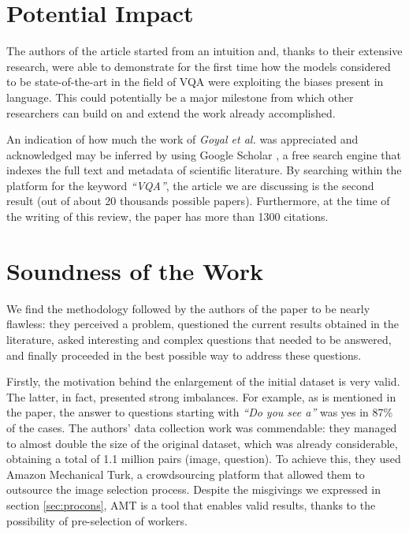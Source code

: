 \documentclass[letterpaper,11pt]{article}
\begin{document}

\section{Potential Impact}

The authors of the article started from an intuition and, thanks to their extensive research, were able to demonstrate for the first time how the models considered to be state-of-the-art in the field of VQA were exploiting the biases present in language. This could potentially be a major milestone from which other researchers can build on and extend the work already accomplished.

An indication of how much the work of \textit{Goyal et al.} was appreciated and acknowledged may be inferred by using Google Scholar \cite{google_scholar}, a free search engine that indexes the full text and metadata of scientific literature. By searching within the platform for the keyword \textit{``VQA''}, the article we are discussing is the second result (out of about 20 thousands possible papers). Furthermore, at the time of the writing of this review, the paper has more than 1300 citations.



\section{Soundness of the Work}
\label{sec:soundness}

We find the methodology followed by the authors of the paper to be nearly flawless: they perceived a problem, questioned the current results obtained in the literature, asked interesting and complex questions that needed to be answered, and finally proceeded in the best possible way to address these questions. 

Firstly, the motivation behind the enlargement of the initial dataset is very valid. The latter, in fact, presented strong imbalances. For example, as is mentioned in the paper, the answer to questions starting with \textit{``Do you see a''} was yes in 87\% of the cases. The authors' data collection work was commendable: they managed to almost double the size of the original dataset, which was already considerable, obtaining a total of 1.1 million pairs (image, question). To achieve this, they used Amazon Mechanical Turk, a crowdsourcing platform that allowed them to outsource the image selection process. Despite the misgivings we expressed in section \ref{sec:procons}, AMT is a tool that enables valid results, thanks to the possibility of pre-selection of workers.
\end{document}
